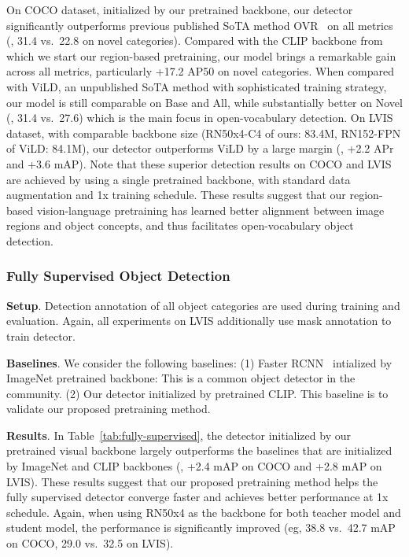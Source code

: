 On COCO dataset, initialized by our pretrained backbone, our detector significantly outperforms previous published SoTA method OVR~\cite{zareian2021open} on all metrics (\eg, 31.4 vs.\ 22.8 on novel categories). Compared with the CLIP backbone from which we start our region-based pretraining, our model brings a remarkable gain across all metrics, particularly +17.2 AP50 on novel categories. When compared with ViLD, an unpublished SoTA method with sophisticated training strategy, our model is still comparable on Base and All, while substantially better on Novel (\eg, 31.4 vs.\ 27.6) which is the main focus in open-vocabulary detection. 
On LVIS dataset, with comparable backbone size (RN50x4-C4 of ours: 83.4M, RN152-FPN of ViLD: 84.1M), our detector outperforms ViLD by a large margin (\eg, +2.2 APr and +3.6 mAP). Note that these superior detection results on COCO and LVIS are achieved by using a single pretrained backbone, with standard data augmentation and 1x training schedule. These results suggest that our region-based vision-language pretraining has learned better alignment between image regions and object concepts, and thus facilitates open-vocabulary object detection.  



\subsubsection{Fully Supervised Object Detection}

\noindent \textbf{Setup}. Detection annotation of all object categories are used during training and evaluation. Again, all experiments on LVIS additionally use mask annotation to train detector.

\smallskip
\noindent \textbf{Baselines}. We consider the following baselines: (1) Faster RCNN~\cite{faster-rcnn} intialized by ImageNet pretrained backbone: This is a common object detector in the community. (2) Our detector initialized by pretrained CLIP. This baseline is to validate our proposed pretraining method.

\smallskip
\noindent \textbf{Results}. In Table~\ref{tab:fully-supervised}, the detector initialized by our pretrained visual backbone largely outperforms the baselines that are initialized by ImageNet and CLIP backbones (\eg, +2.4 mAP on COCO and +2.8 mAP on LVIS). These results suggest that our proposed pretraining method helps the fully supervised detector converge faster and achieves better performance at 1x schedule. 
Again, when using RN50x4 as the backbone for both teacher model and student model, the performance is significantly improved (eg, 38.8 vs.\ 42.7 mAP on COCO, 29.0 vs.\ 32.5 on LVIS).


